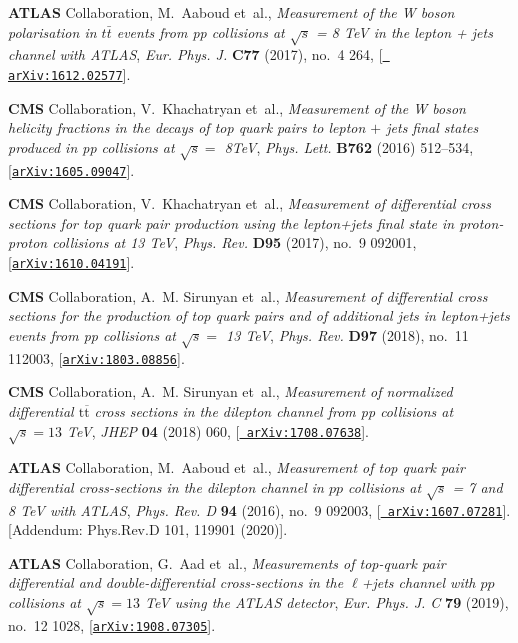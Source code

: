 \documentclass[11pt,a4paper]{article}
\numberwithin{equation}{section}
\numberwithin{figure}{section}
\numberwithin{table}{section}
\begin{document}
\begin{thebibliography}{100}
{\bf ATLAS} Collaboration, M.~Aaboud et~al., {\it {Measurement of the W boson
  polarisation in $t\bar{t}$ events from pp collisions at $\sqrt{s}$ = 8 TeV in
  the lepton + jets channel with ATLAS}},  {\em Eur. Phys. J.} {\bf C77}
  (2017), no.~4 264, [\href{http://arxiv.org/abs/1612.02577}{{\tt
  arXiv:1612.02577}}].

{\bf CMS} Collaboration, V.~Khachatryan et~al., {\it {Measurement of the W
  boson helicity fractions in the decays of top quark pairs to lepton $+$ jets
  final states produced in pp collisions at $\sqrt s=$ 8TeV}},  {\em Phys.
  Lett.} {\bf B762} (2016) 512--534,
  [\href{http://arxiv.org/abs/1605.09047}{{\tt arXiv:1605.09047}}].

{\bf CMS} Collaboration, V.~Khachatryan et~al., {\it {Measurement of
  differential cross sections for top quark pair production using the
  lepton+jets final state in proton-proton collisions at 13 TeV}},  {\em Phys.
  Rev.} {\bf D95} (2017), no.~9 092001,
  [\href{http://arxiv.org/abs/1610.04191}{{\tt arXiv:1610.04191}}].

{\bf CMS} Collaboration, A.~M. Sirunyan et~al., {\it {Measurement of
  differential cross sections for the production of top quark pairs and of
  additional jets in lepton+jets events from pp collisions at $\sqrt{s} =$ 13
  TeV}},  {\em Phys. Rev.} {\bf D97} (2018), no.~11 112003,
  [\href{http://arxiv.org/abs/1803.08856}{{\tt arXiv:1803.08856}}].

{\bf CMS} Collaboration, A.~M. Sirunyan et~al., {\it {Measurement of normalized
  differential $ \mathrm{t}\overline{\mathrm{t}} $ cross sections in the
  dilepton channel from pp collisions at $ \sqrt{s}=13 $ TeV}},  {\em JHEP}
  {\bf 04} (2018) 060, [\href{http://arxiv.org/abs/1708.07638}{{\tt
  arXiv:1708.07638}}].

{\bf ATLAS} Collaboration, M.~Aaboud et~al., {\it {Measurement of top quark
  pair differential cross-sections in the dilepton channel in $pp$ collisions
  at $\sqrt{s}$ = 7 and 8 TeV with ATLAS}},  {\em Phys. Rev. D} {\bf 94}
  (2016), no.~9 092003, [\href{http://arxiv.org/abs/1607.07281}{{\tt
  arXiv:1607.07281}}]. [Addendum: Phys.Rev.D 101, 119901 (2020)].

{\bf ATLAS} Collaboration, G.~Aad et~al., {\it {Measurements of top-quark pair
  differential and double-differential cross-sections in the $\ell$+jets
  channel with $pp$ collisions at $\sqrt{s}=13$ TeV using the ATLAS detector}},
   {\em Eur. Phys. J. C} {\bf 79} (2019), no.~12 1028,
  [\href{http://arxiv.org/abs/1908.07305}{{\tt arXiv:1908.07305}}].


\end{thebibliography}
\end{document}
